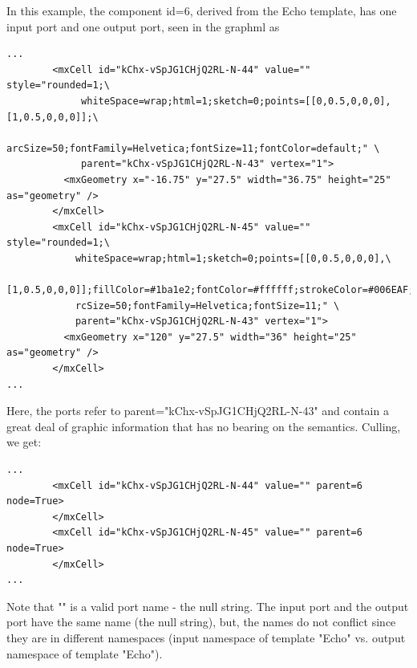 \documentclass[10pt,anonymous,review]{acmart}
\begin{document}
In this example, the component id=6, derived from the Echo template, has one input port and one output port, seen in the graphml as
\begin{verbatim}
...
        <mxCell id="kChx-vSpJG1CHjQ2RL-N-44" value="" style="rounded=1;\
             whiteSpace=wrap;html=1;sketch=0;points=[[0,0.5,0,0,0],[1,0.5,0,0,0]];\
             arcSize=50;fontFamily=Helvetica;fontSize=11;fontColor=default;" \
             parent="kChx-vSpJG1CHjQ2RL-N-43" vertex="1">
          <mxGeometry x="-16.75" y="27.5" width="36.75" height="25" as="geometry" />
        </mxCell>
        <mxCell id="kChx-vSpJG1CHjQ2RL-N-45" value="" style="rounded=1;\
            whiteSpace=wrap;html=1;sketch=0;points=[[0,0.5,0,0,0],\
            [1,0.5,0,0,0]];fillColor=#1ba1e2;fontColor=#ffffff;strokeColor=#006EAF;a\
            rcSize=50;fontFamily=Helvetica;fontSize=11;" \
            parent="kChx-vSpJG1CHjQ2RL-N-43" vertex="1">
          <mxGeometry x="120" y="27.5" width="36" height="25" as="geometry" />
        </mxCell>
...  
\end{verbatim}
Here, the ports refer to parent="kChx-vSpJG1CHjQ2RL-N-43" and contain a great deal of graphic information that has no bearing on the semantics.
Culling, we get:
\begin{verbatim}
...
        <mxCell id="kChx-vSpJG1CHjQ2RL-N-44" value="" parent=6 node=True>
        </mxCell>
        <mxCell id="kChx-vSpJG1CHjQ2RL-N-45" value="" parent=6 node=True>
        </mxCell>
...  
\end{verbatim}
Note that "" is a valid port name - the null string. The input port and the output port have the same name (the null string), but, the names do not conflict since they are in different namespaces (input namespace of template "Echo" vs. output namespace of template "Echo").
\end{document}
